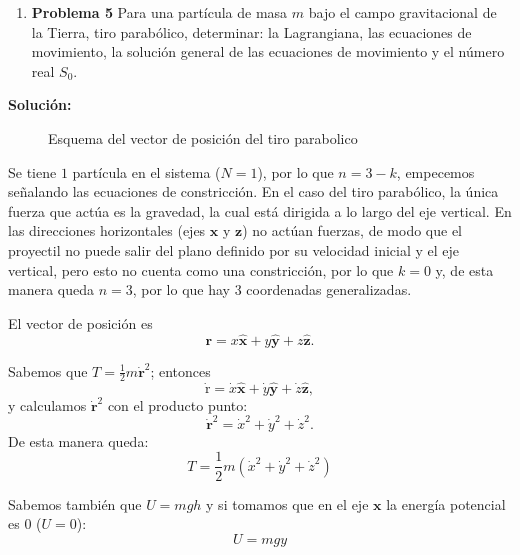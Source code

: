 \documentclass{article}
\begin{document}
\begin{enumerate}[label={{\textcolor{trueblue}{\textbf{Pr.} \arabic*.5}}}, start=2]
  \item \textbf{Problema 5} Para una partícula de masa \(m\) bajo el campo gravitacional de la Tierra, tiro parabólico, determinar: la Lagrangiana, las ecuaciones de movimiento, la solución general de las ecuaciones de movimiento y el número real  \(S_0\).
\end{enumerate}

\textcolor{Cinnabar}{\textbf{Soluci\'on:}}


\begin{figure}[h]
\centering
\caption{Esquema del vector de posición del tiro parabolico }
\label{fig:lupa}
\end{figure}

Se tiene $1$ partícula en el sistema ($N=1$), por lo que $n = 3-k$, empecemos señalando las ecuaciones de constricción. En el caso del tiro parabólico, la única fuerza que actúa es la gravedad, la cual está dirigida a lo largo del eje vertical. En las direcciones horizontales (ejes $\mathbf{x}$ y $\mathbf{z}$) no actúan fuerzas, de modo que el proyectil no puede salir del plano definido por su velocidad inicial y el eje vertical, pero esto no cuenta como una constricción, por lo que $k=0$ y, de esta manera queda $n=3$, por lo que hay 3 coordenadas generalizadas.

El vector de posici\'on es
\begin{equation}
    \mathbf{r} = x \mathbf{\hat{x}} + y \mathbf{\hat{y}} + z \mathbf{\hat{z}}.
\end{equation}

Sabemos que $T=\frac{1}{2}m \mathbf{\dot{r}}^2$; entonces
\begin{equation}
    \mathrm{\dot{r}} = \dot{x} \mathbf{\hat{x}} + \dot{y} \mathbf{\hat{y}} + \dot{z} \mathbf{\hat{z}},
\end{equation}
y calculamos $\mathbf{\dot{r}}^2$ con el producto punto:
\begin{equation}
    \mathbf{\dot{r}}^2 = \dot{x}^2 + \dot{y}^2 + \dot{z}^2.
\end{equation}
De esta manera queda: 
\begin{equation}
    T = \frac{1}{2}m(\dot{x}^2 + \dot{y}^2 + \dot{z}^2)
\end{equation}

Sabemos tambi\'en que $U=mgh$ y si tomamos que en el eje $\mathbf{x}$ la energía potencial es 0 ($U=0$):
\begin{equation}
    U = mgy
\end{equation}
\end{document}
